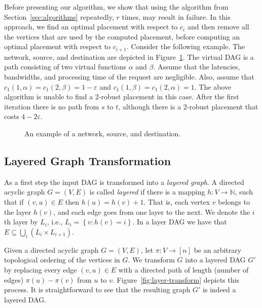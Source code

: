 \documentclass[11pt]{article}
\newcommand{\set}[1]{\left\{ #1 \right\}}
\newcommand{\naturals}{\mathbb{N}}
\newcommand{\eps}{\varepsilon}
\begin{document}
Before presenting our algorithm, we show that using the algorithm from
Section~\ref{sec:algorithms} repeatedly, $r$ times, may result in
failure.  In this approach, we find an optimal placement with respect
to $c_i$ and then remove all the vertices that are used by the
computed placement, before computing an optimal placement with respect
to $c_{i+1}$.
%
Consider the following example.  The network, source, and destination
are depicted in Figure~\ref{fig:greedy-bad}.  The virtual DAG is a
path consisting of two virtual functions $\alpha$ and $\beta$.  Assume
that the latencies, bandwidths, and processing time of the request are
negligible.  Also, assume that $c_1(1, \alpha) = c_1(2,\beta) =
1-\eps$ and $c_1(1, \beta) = c_1(2, \alpha) = 1$.
%
The above algorithm is unable to find a 2-robust placement in this
case.  After the first iteration there is no path from $s$ to $t$,
although there is a 2-robust placement that costs $4 - 2 \eps$.

\begin{figure}[t]
\begin{center}

\end{center}
\caption{An example of a network, source, and destination.}
\label{fig:greedy-bad}
\end{figure}


\subsection{Layered Graph Transformation}

As a first step the input DAG is transformed into a \emph{layered
  graph}.
%
A directed acyclic graph $G = (V,E)$ is called \emph{layered} if there
is a mapping $h:V \to \naturals$, such that if $(v,u) \in E$ then
$h(u) = h(v) + 1$.  That is, each vertex $v$ belongs to the layer
$h(v)$, and each edge goes from one layer to the next.
%
We denote the $i$th layer by $L_i$, i.e., $L_i = \set{v : h(v) = i}$.
In a layer DAG we have that $E \subseteq \bigcup_i (L_i \times
L_{i+1})$.

Given a directed acyclic graph $G = (V,E)$, let $\pi:V \to [n]$ be an
arbitrary topological ordering of the vertices in $G$.  We transform
$G$ into a layered DAG $G'$ by replacing every edge $(v,u) \in E$ with
a directed path of length (number of edges) $\pi(u) - \pi(v)$ from $u$
to $v$.
%
Figure~\ref{fig:layer-transform} depicts this process.  It is
straightforward to see that the resulting graph $G'$ is indeed a
layered DAG.
\end{document}

